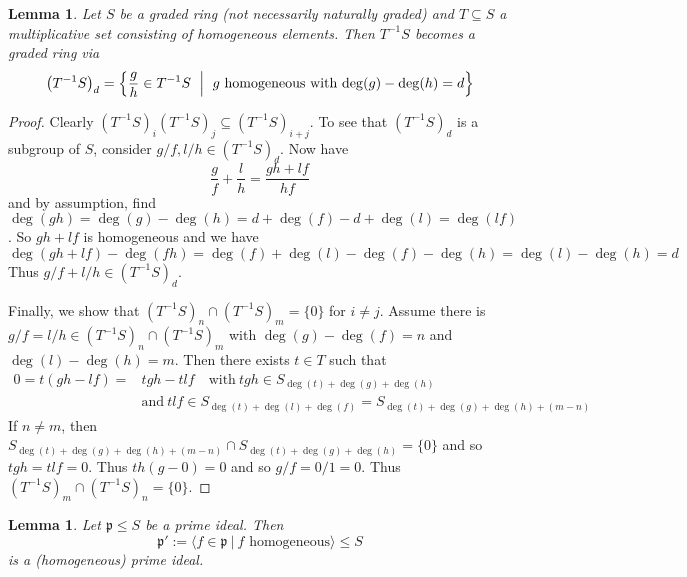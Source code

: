 \documentclass{scrartcl}
\newcommand{\p}{\mathfrak{p}}
\newtheorem{lemma}[prop]{Lemma}
\theoremstyle{definition}
\begin{document}
\begin{lemma}
    Let $S$ be a graded ring (not necessarily naturally graded) and $T \subseteq S$ a multiplicative set consisting of homogeneous elements. 
    Then $T^{-1}S$ becomes a graded ring via
    \begin{equation*}
        \left(T^{-1}S\right)_d = \Bigl\{ \frac g h \in T^{-1}S \ \Bigm| \ \text{$g$ homogeneous with $\deg(g) - \deg(h) = d$} \Bigr\}
    \end{equation*}
\end{lemma}
\begin{proof}
    Clearly $(T^{-1}S)_i (T^{-1}S)_j \subseteq (T^{-1}S)_{i + j}$.
    To see that $(T^{-1}S)_d$ is a subgroup of $S$, consider $g/f, l/h \in (T^{-1}S)_d$.
    Now have
    \begin{equation*}
        \frac g f + \frac l h = \frac {gh + lf} {hf}
    \end{equation*}
    and by assumption, find $\deg(gh) = \deg(g) - \deg(h) = d + \deg(f) - d + \deg(l) = \deg(lf)$.
    So $gh + lf$ is homogeneous and we have
    \begin{equation*}
        \deg(gh + lf) - \deg(fh) = \deg(f) + \deg(l) - \deg(f) - \deg(h) = \deg(l) - \deg(h) = d
    \end{equation*}
    Thus $g/f + l/h \in (T^{-1}S)_d$.

    Finally, we show that $(T^{-1}S)_n \cap (T^{-1}S)_m = \{ 0 \}$ for $i \neq j$.
    Assume there is $g/f = l/h \in (T^{-1}S)_n \cap (T^{-1}S)_m$ with $\deg(g) - \deg(f) = n$ and $\deg(l) - \deg(h) = m$.
    Then there exists $t \in T$ such that
    \begin{align*}
        0 = t(gh - lf) =& tgh - tlf \quad \text{with}\ tgh \in S_{\deg(t) + \deg(g) + \deg(h)} \\
        &\text{and}\ tlf \in S_{\deg(t) + \deg(l) + \deg(f)} = S_{\deg(t) + \deg(g) + \deg(h) + (m - n)}
    \end{align*}
    If $n \neq m$, then $S_{\deg(t) + \deg(g) + \deg(h) + (m - n)} \cap S_{\deg(t) + \deg(g) + \deg(h)} = \{ 0 \}$ and so $tgh = tlf = 0$.
    Thus $th(g - 0) = 0$ and so $g/f = 0/1 = 0$.
    Thus $(T^{-1}S)_m \cap (T^{-1}S)_n = \{ 0 \}$.
\end{proof}
\begin{lemma}
    \label{prop:homogeneous_part_prime}
    Let $\p \leq S$ be a prime ideal.
    Then
    \begin{equation*}
        \p' := \langle f \in \p \ | \ \text{$f$ homogeneous} \rangle \leq S
    \end{equation*}
    is a (homogeneous) prime ideal.
\end{lemma}
\end{document}
